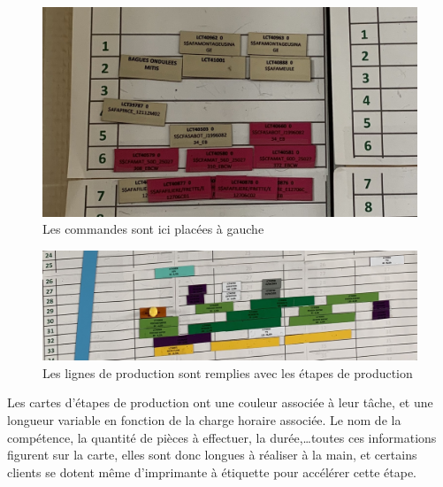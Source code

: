 \begin{figure}[!h]
    \centering 
    \includegraphics[scale=0.3]{img/productionItem.jpg}
    \caption{Les commandes sont ici placées à gauche}
    \label{fig:ProductionItem}
\end{figure}
\begin{figure}[!h]
    \centering
    \includegraphics[scale=0.19]{img/ligne_production.jpg}
    \caption{Les lignes de production sont remplies avec les étapes de production}
    \label{fig:productionLigne}
\end{figure}   

Les cartes d'étapes de production ont une couleur associée à leur tâche, et une longueur variable en fonction de la charge horaire associée. Le nom de la compétence, la quantité de pièces à effectuer, la durée,\dots toutes ces informations figurent sur la carte, elles sont donc longues à réaliser à la main, et certains clients se dotent même d'imprimante à étiquette pour accélérer cette étape.
\hfill \\


